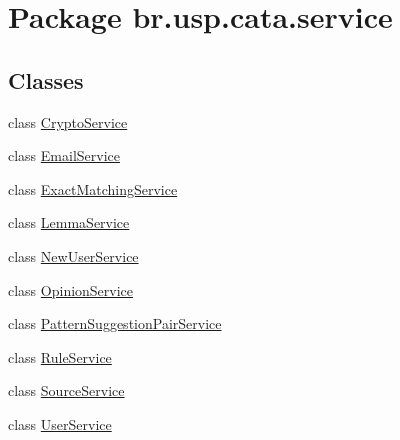 \hypertarget{namespacebr_1_1usp_1_1cata_1_1service}{\section{Package br.\+usp.\+cata.\+service}
\label{namespacebr_1_1usp_1_1cata_1_1service}
}
\subsection*{Classes}
\begin{DoxyCompactItemize}
\item 
class \hyperlink{classbr_1_1usp_1_1cata_1_1service_1_1_crypto_service}{Crypto\+Service}
\item 
class \hyperlink{classbr_1_1usp_1_1cata_1_1service_1_1_email_service}{Email\+Service}
\item 
class \hyperlink{classbr_1_1usp_1_1cata_1_1service_1_1_exact_matching_service}{Exact\+Matching\+Service}
\item 
class \hyperlink{classbr_1_1usp_1_1cata_1_1service_1_1_lemma_service}{Lemma\+Service}
\item 
class \hyperlink{classbr_1_1usp_1_1cata_1_1service_1_1_new_user_service}{New\+User\+Service}
\item 
class \hyperlink{classbr_1_1usp_1_1cata_1_1service_1_1_opinion_service}{Opinion\+Service}
\item 
class \hyperlink{classbr_1_1usp_1_1cata_1_1service_1_1_pattern_suggestion_pair_service}{Pattern\+Suggestion\+Pair\+Service}
\item 
class \hyperlink{classbr_1_1usp_1_1cata_1_1service_1_1_rule_service}{Rule\+Service}
\item 
class \hyperlink{classbr_1_1usp_1_1cata_1_1service_1_1_source_service}{Source\+Service}
\item 
class \hyperlink{classbr_1_1usp_1_1cata_1_1service_1_1_user_service}{User\+Service}
\end{DoxyCompactItemize}
